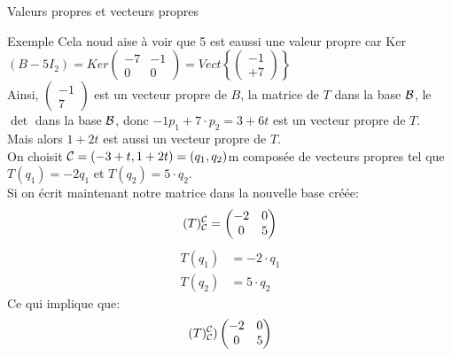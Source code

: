 \begin{parag}{Valeurs propres et vecteurs propres}
\begin{subparag}{Exemple}
        Cela noud aise à voir que 5 est eaussi une valeur propre car Ker$(B - 5I_2) = Ker \begin{pmatrix}
            -7 & -1 \\ 0 & 0
        \end{pmatrix} = Vect\left\{\begin{pmatrix}
            -1 \\ +7
        \end{pmatrix}\right\}$\\
        Ainsi, $\begin{pmatrix}
            -1 \\ 7
        \end{pmatrix}$ est un vecteur propre de $B$, la matrice de $T$ dans la base $\mathcal{B}$, le $\det$ dans la base $\mathcal{B}$, donc $-1p_1 + 7\cdot p_2 = 3 +  6t$ est un vecteur propre de $T$.\\
        Mais alors $1 + 2t$ est aussi un vecteur propre de $T$.
        \\
        On choisit $\mathcal{C} = (-3 + t, 1 + 2t) = (q_1, q_2)$m composée de vecteurs propres tel que $T(q_1) = -2q_1$ et $T(q_2) = 5\cdot q_2$.
        \\
        Si on écrit maintenant notre matrice dans la nouvelle base créée:
        \[(T)_{\mathcal{C}}^{\mathcal{C}} = \begin{pmatrix}
            -2  & 0 \\ 0 & 5
        \end{pmatrix}\]
        \begin{align*}
            T(q_1) &= -2\cdot q_1\\
            T(q_2) &= 5\cdot q_2
        \end{align*}
        Ce qui implique que:
        \[(T)_{\mathcal{C}}^{\mathcal{C}} ) \begin{pmatrix}
            -2 & 0 \\ 0 & 5
        \end{pmatrix}\]
    \end{subparag}
    \end{parag}     

